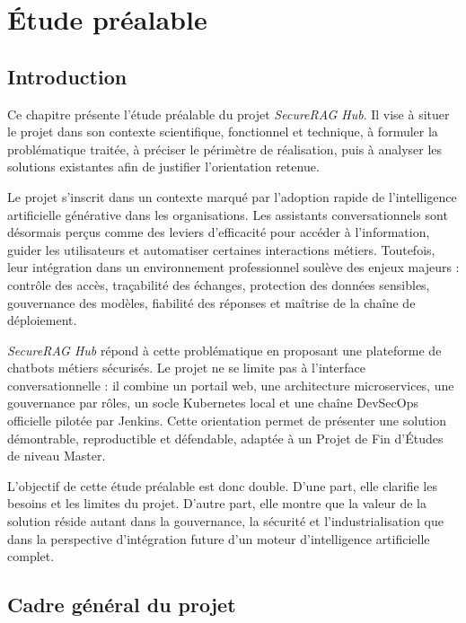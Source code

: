 \chapter{Étude préalable}
\fancyhead[L]{\leftmark}

\section{Introduction}

Ce chapitre présente l'étude préalable du projet \textit{SecureRAG Hub}. Il vise à situer le projet dans son contexte scientifique, fonctionnel et technique, à formuler la problématique traitée, à préciser le périmètre de réalisation, puis à analyser les solutions existantes afin de justifier l'orientation retenue.

Le projet s'inscrit dans un contexte marqué par l'adoption rapide de l'intelligence artificielle générative dans les organisations. Les assistants conversationnels sont désormais perçus comme des leviers d'efficacité pour accéder à l'information, guider les utilisateurs et automatiser certaines interactions métiers. Toutefois, leur intégration dans un environnement professionnel soulève des enjeux majeurs : contrôle des accès, traçabilité des échanges, protection des données sensibles, gouvernance des modèles, fiabilité des réponses et maîtrise de la chaîne de déploiement.

\textit{SecureRAG Hub} répond à cette problématique en proposant une plateforme de chatbots métiers sécurisés. Le projet ne se limite pas à l'interface conversationnelle : il combine un portail web, une architecture microservices, une gouvernance par rôles, un socle Kubernetes local et une chaîne DevSecOps officielle pilotée par Jenkins. Cette orientation permet de présenter une solution démontrable, reproductible et défendable, adaptée à un Projet de Fin d'Études de niveau Master.

L'objectif de cette étude préalable est donc double. D'une part, elle clarifie les besoins et les limites du projet. D'autre part, elle montre que la valeur de la solution réside autant dans la gouvernance, la sécurité et l'industrialisation que dans la perspective d'intégration future d'un moteur d'intelligence artificielle complet.

\section{Cadre général du projet}

